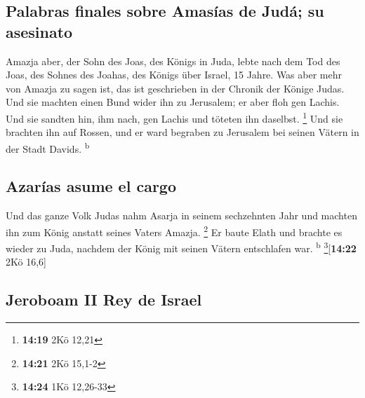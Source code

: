 \hypertarget{palabras-finales-sobre-amasuxedas-de-juduxe1-su-asesinato}{%
\subsection{Palabras finales sobre Amasías de Judá; su
asesinato}\label{palabras-finales-sobre-amasuxedas-de-juduxe1-su-asesinato}}

 Amazja aber, der Sohn des Joas, des Königs in Juda,
lebte nach dem Tod des Joas, des Sohnes des Joahas, des Königs über
Israel, 15 Jahre.  Was aber mehr von Amazja zu sagen ist,
das ist geschrieben in der Chronik der Könige Judas.  Und
sie machten einen Bund wider ihn zu Jerusalem; er aber floh gen Lachis.
Und sie sandten hin, ihm nach, gen Lachis und töteten ihn daselbst.
\footnote{\textbf{14:19} 2Kö 12,21}  Und sie brachten ihn
auf Rossen, und er ward begraben zu Jerusalem bei seinen Vätern in der
Stadt Davids. \textsuperscript{b}

\hypertarget{azaruxedas-asume-el-cargo}{%
\subsection{Azarías asume el cargo}\label{azaruxedas-asume-el-cargo}}

 Und das ganze Volk Judas nahm Asarja in seinem
sechzehnten Jahr und machten ihn zum König anstatt seines Vaters Amazja.
\footnote{\textbf{14:21} 2Kö 15,1-2}  Er baute Elath und
brachte es wieder zu Juda, nachdem der König mit seinen Vätern
entschlafen war. \textsuperscript{b} \footnote{\textbf{14:24} 1Kö
  12,26-33}{[}\textbf{14:22} 2Kö 16,6{]}

\hypertarget{jeroboam-ii-rey-de-israel}{%
\subsection{Jeroboam II Rey de Israel}\label{jeroboam-ii-rey-de-israel}}

